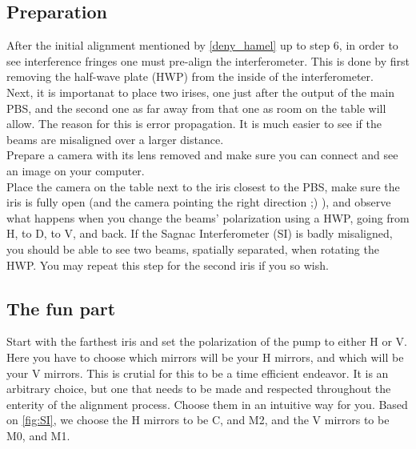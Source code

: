 \subsection{Preparation}
After the initial alignment mentioned by \ref{deny_hamel} up to step 6, in order to see interference fringes one must pre-align the interferometer. This is done by first removing the half-wave plate (HWP)
from the inside of the interferometer.\\
Next, it is importanat to place two irises, one just after the output of the main PBS, and the second one as far away from that one as room on the table will allow.
The reason for this is error propagation. It is much easier to see if the beams are misaligned over a larger distance.\\
Prepare a camera with its lens removed and make sure you can connect and see an image on your computer.\\
Place the camera on the table next to the iris closest to the PBS, make sure the iris is fully open (and the camera pointing the right direction ;) ),
and observe what happens when you change the beams' polarization using a HWP, going from H, to D, to V, and back. If the Sagnac Interferometer (SI) is badly misaligned,
you should be able to see two beams, spatially separated, when rotating the HWP. You may repeat this step for the second iris if you so wish.\\
\subsection{The fun part}
Start with the farthest iris and set the polarization of the pump to either H or V. Here you have to choose which mirrors will be your H mirrors, and which will be your V mirrors.
This is crutial for this to be a time efficient endeavor. It is an arbitrary choice, but one that needs to be made and respected throughout the enterity of the alignment process.
Choose them in an intuitive way for you. Based on \ref{fig:SI}, we choose the H mirrors to be C, and M2, and the V mirrors to be M0, and M1.

